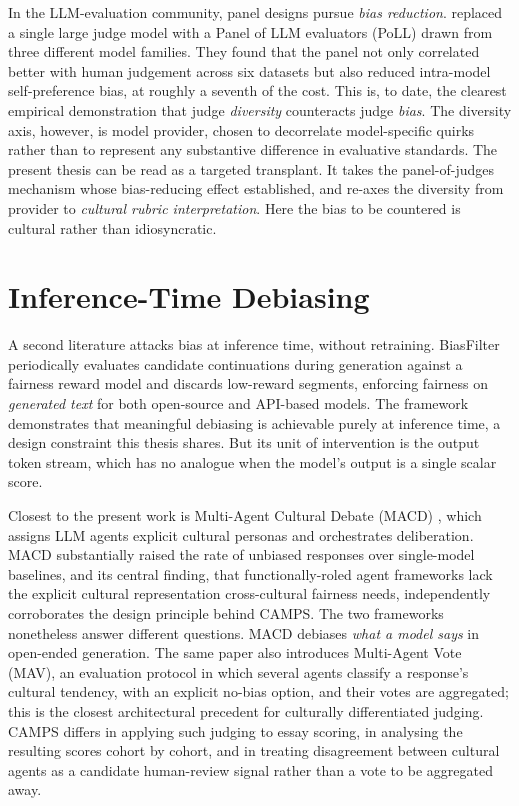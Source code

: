 In the LLM-evaluation community, panel designs pursue \emph{bias
reduction}. \citet{verga2024replacing} replaced a single large judge
model with a Panel of LLM evaluators (PoLL) drawn from three different
model families. They found that the panel not only correlated better
with human judgement across six datasets but also reduced intra-model
self-preference bias, at roughly a seventh of the cost. This is, to
date, the clearest empirical demonstration that judge \emph{diversity}
counteracts judge \emph{bias}. The diversity axis, however, is model
provider, chosen to decorrelate model-specific quirks rather than to
represent any substantive difference in evaluative standards. The
present thesis can be read as a targeted transplant. It takes the
panel-of-judges mechanism whose bias-reducing effect
\citet{verga2024replacing} established, and re-axes the diversity from
provider to \emph{cultural rubric interpretation}. Here the bias to be
countered is cultural rather than idiosyncratic.

\section{Inference-Time Debiasing}
\label{sec:lit-debias}

A second literature attacks bias at inference time, without retraining.
BiasFilter \citep{cheng2025biasfilter} periodically evaluates candidate
continuations during generation against a fairness reward model and
discards low-reward segments, enforcing fairness on \emph{generated
text} for both open-source and API-based models. The framework
demonstrates that meaningful debiasing is achievable purely at
inference time, a design constraint this thesis shares. But its
unit of intervention is the output token stream, which has no analogue
when the model's output is a single scalar score.

Closest to the present work is Multi-Agent Cultural Debate (MACD)
\citep{tan2026macd}, which assigns LLM agents explicit cultural
personas and orchestrates deliberation. MACD substantially raised the
rate of unbiased responses over single-model baselines, and its
central finding, that functionally-roled agent frameworks lack the
explicit cultural representation cross-cultural fairness needs,
independently corroborates the design principle behind CAMPS. The two
frameworks nonetheless answer different questions. MACD debiases
\emph{what a model says} in open-ended generation. The same paper
also introduces Multi-Agent Vote (MAV), an evaluation protocol in
which several agents classify a response's cultural tendency, with
an explicit no-bias option, and their votes are aggregated; this is
the closest architectural precedent for culturally differentiated
judging. CAMPS differs in applying such judging to essay scoring,
in analysing the resulting scores cohort by cohort, and in treating
disagreement between cultural agents as a candidate human-review
signal rather than a vote to be aggregated away.

